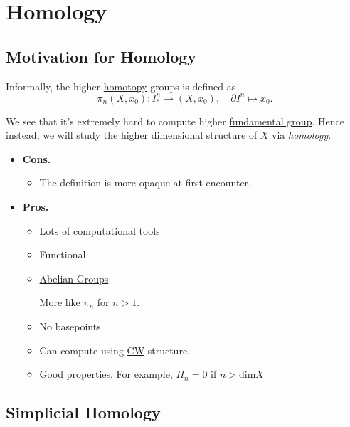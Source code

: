\chapter{Homology}
\section{Motivation for Homology}
Informally, the higher \hyperref[def:homotopy]{homotopy} groups is defined as
\[
	\pi _{n} (X, x_0)\colon I^n_\ast \to (X, x_0),\quad \partial I^n \mapsto x_0.
\]

\begin{figure}[H]
	\centering
	\label{fig:higher-homotopy-group-dim2}
\end{figure}


We see that it's extremely hard to compute higher \hyperref[def:fundamental-group]{fundamental group}. Hence instead,
we will study the higher dimensional structure of \(X\) via \emph{homology}.

\begin{itemize}
	\item \textbf{Cons.}
	      \begin{itemize}
		      \item The definition is more opaque at first encounter.
	      \end{itemize}
	\item \textbf{Pros.}
	      \begin{itemize}
		      \item Lots of computational tools
		      \item Functional
		      \item \hyperref[def:Abelian-group]{Abelian Groups}
		            \begin{remark}
			            More like \(\pi _n\) for \(n>1\).
		            \end{remark}
		      \item No basepoints
		      \item Can compute using \hyperref[def:CW-subcomplex]{CW} structure.
		      \item Good properties. For example, \(H_{n} = 0\) if \(n > \mathrm{dim} X\)
	      \end{itemize}
\end{itemize}

\section{Simplicial Homology}
